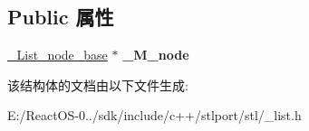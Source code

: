 \subsection*{Public 属性}
\begin{DoxyCompactItemize}
\item 
\mbox{\label{struct___list__iterator__base_a4081ed80a33c2e23d054964cbba9f98b}} 
\hyperlink{struct___list__node__base}{\+\_\+\+List\+\_\+node\+\_\+base} $\ast$ {\bfseries \+\_\+\+M\+\_\+node}
\end{DoxyCompactItemize}


该结构体的文档由以下文件生成\+:\begin{DoxyCompactItemize}
\item 
E\+:/\+React\+O\+S-\/0../sdk/include/c++/stlport/stl/\+\_\+list.\+h\end{DoxyCompactItemize}
